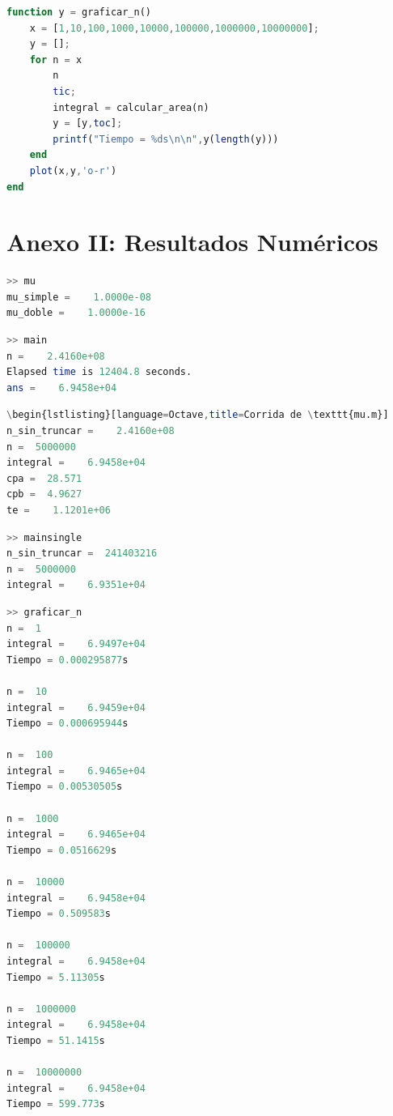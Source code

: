 \documentclass[11pt,a4paper]{article}
\begin{document}
\begin{lstlisting}[language=Octave,title=Truncamiento y gráfico de n]
function y = graficar_n()
    x = [1,10,100,1000,10000,100000,1000000,10000000];
    y = [];
    for n = x
        n
        tic;
        integral = calcular_area(n)
        y = [y,toc]; 
        printf("Tiempo = %ds\n\n",y(length(y)))   
    end
    plot(x,y,'o-r')
end
\end{lstlisting}

\newpage
\section{Anexo II: Resultados Numéricos}

\begin{lstlisting}[language=Octave,title=Corrida de \texttt{mu.m}]
>> mu
mu_simple =    1.0000e-08
mu_doble =    1.0000e-16
\end{lstlisting}

\begin{lstlisting}[language=Octave,title=title=Corrida de \texttt{main.m} con n original]
>> main
n =    2.4160e+08
Elapsed time is 12404.8 seconds.
ans =    6.9458e+04
\end{lstlisting}

\begin{lstlisting}[language=Octave,title=title=Corrida de \texttt{main.m}]
\begin{lstlisting}[language=Octave,title=Corrida de \texttt{mu.m}]
n_sin_truncar =    2.4160e+08
n =  5000000
integral =    6.9458e+04  
cpa =  28.571
cpb =  4.9627
te =    1.1201e+06
\end{lstlisting}

\begin{lstlisting}[language=Octave,title=title=Corrida de \texttt{mainsingle.m}]
>> mainsingle
n_sin_truncar =  241403216
n =  5000000
integral =    6.9351e+04
\end{lstlisting}

\begin{lstlisting}[language=Octave,title=Cálculos hechos para el criterio de truncamiento de n]
>> graficar_n
n =  1
integral =    6.9497e+04
Tiempo = 0.000295877s

n =  10
integral =    6.9459e+04
Tiempo = 0.000695944s

n =  100
integral =    6.9465e+04
Tiempo = 0.00530505s

n =  1000
integral =    6.9465e+04
Tiempo = 0.0516629s

n =  10000
integral =    6.9458e+04
Tiempo = 0.509583s

n =  100000
integral =    6.9458e+04
Tiempo = 5.11305s

n =  1000000
integral =    6.9458e+04
Tiempo = 51.1415s

n =  10000000
integral =    6.9458e+04
Tiempo = 599.773s
\end{lstlisting}
\end{document}
